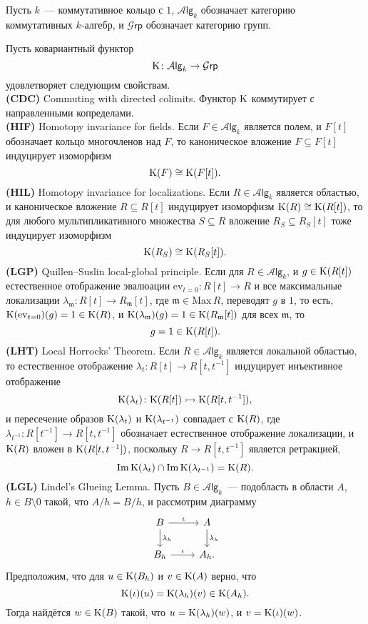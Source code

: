\documentclass[oneside, 11pt]{amsart} \pdfoutput=1
\begin{document}
Пусть $k$~--- коммутативное кольцо с $1$, $\mathcal A\mathsf{lg}_k$ обозначает категорию коммутативных $k$-алгебр, и $\mathcal G\mathsf{rp}$ обозначает категорию групп.
\begin{theorem}
\label{lpb}
Пусть ковариантный функтор 
$$
{\mathrm{K}}\colon\mathcal A\mathsf{lg}_k\rightarrow\mathcal G\mathsf{rp}
$$
удовлетворяет следующим свойствам.\\
{\rm\bf (CDC)} Commuting with directed colimits. Функтор ${\mathrm{K}}$ коммутирует с направленными копределами.\\
{\rm\bf (HIF)} Homotopy invariance for fields. Если $F\in\mathcal A\mathsf{lg}_k$ является полем, и $F[t]$ обозначает кольцо многочленов над $F$, то каноническое вложение $F\subseteq F[t]$ индуцирует изоморфизм
$$
{\mathrm{K}}(F)\cong{\mathrm{K}}(F[t]).
$$
{\rm\bf (HIL)} Homotopy invariance for localizations. Если $R\in\mathcal A\mathsf{lg}_k$ является областью, и каноническое вложение $R\subseteq R[t]$ индуцирует изоморфизм ${\mathrm{K}}(R)\cong{\mathrm{K}}(R[t])$, то для любого мультипликативного множества $S\subseteq R$ вложение $R_S\subseteq R_S[t]$ тоже индуцирует изоморфизм
$$
{\mathrm{K}}(R_S)\cong{\mathrm{K}}(R_S[t]).
$$
{\rm\bf (LGP)} Quillen--Suslin local-global principle. Если для $R\in\mathcal A\mathsf{lg}_k$, и $g\in{\mathrm{K}}(R[t])$ естественное отображение эвалюации $\mathrm{ev}_{t=0}\colon R[t]\rightarrow R$ и все максимальные локализации $\lambda_{\mathfrak m}\colon R[t]\rightarrow R_{\mathfrak m}[t]$, где $\mathfrak m\in\mathrm{Max}\,R$, переводят $g$ в $1$, то есть, ${\mathrm{K}}(\mathrm{ev}_{t=0})(g)=1\in{\mathrm{K}}(R)$, и ${\mathrm{K}}(\lambda_{\mathfrak m})(g)=1\in{\mathrm{K}}(R_{\mathfrak m}[t])$ для всех $\mathfrak m$, то $$g=1\in{\mathrm{K}}(R[t]).$$
{\rm\bf (LHT)} Local Horrocks' Theorem. Если $R\in\mathcal A\mathsf{lg}_k$ является локальной областью, то естественное отображение $\lambda_t\colon R[t]\rightarrow R[t,t^{-1}]$ индуцирует инъективное отображение 
$$
{\mathrm{K}}(\lambda_t)\colon{\mathrm{K}}(R[t])\rightarrowtail{\mathrm{K}}(R[t,t^{-1}]),
$$ 
и пересечение образов ${\mathrm{K}}(\lambda_t)$ и ${\mathrm{K}}(\lambda_{t^{-1}})$ совпадает с ${\mathrm{K}}(R)$, где $\lambda_{t^{-1}}\colon R[t^{-1}]\rightarrow R[t,t^{-1}]$ обозначает естественное отображение локализации, и ${\mathrm{K}}(R)$ вложен в ${\mathrm{K}}(R[t,t^{-1}])$, поскольку $R\rightarrow R[t,t^{-1}]$ является ретракцией,
$$
\mathrm{Im}\,{\mathrm{K}}(\lambda_t)\cap\mathrm{Im}\,{\mathrm{K}}(\lambda_{t^{-1}}) = {\mathrm{K}}(R).
$$
{\rm\bf (LGL)} Lindel's Glueing Lemma. Пусть $B\in\mathcal A\mathsf{lg}_k$~--- подобласть в области $A$, $h\in B\setminus0$ такой, что $A/h = B/h$, и рассмотрим диаграмму
$$\begin{tikzcd}
B \ar{r}{\iota} \ar{d}{\lambda_h} & A \ar{d}{\lambda_h}\\
B_h \ar{r}{\iota} & A_h.
\end{tikzcd}$$
Предположим, что для $u\in{\mathrm{K}}(B_h)$ и $v\in{\mathrm{K}}(A)$ верно, что $${\mathrm{K}}(\iota)(u)={\mathrm{K}}(\lambda_h)(v)\in{\mathrm{K}}(A_h).$$
Тогда найдётся $w\in{\mathrm{K}}(B)$ такой, что $u={\mathrm{K}}(\lambda_h)(w)$, и $v={\mathrm{K}}(\iota)(w)$.


\end{theorem}
\end{document}
